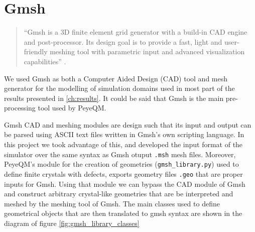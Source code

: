 \section{Gmsh}
\begin{quote}
``Gmsh is a 3D finite element grid generator with a build-in CAD engine and post-processor. Its design goal is to provide a fast, light and user-friendly meshing tool with parametric input and advanced visualization capabilities'' \cite{Geuzaine2009}. 
\end{quote}
We used Gmsh as both a Computer Aided Design (CAD) tool and mesh generator for the modelling of simulation domains used in most part of the results presented in \ref{ch:results}. It could be said that Gmsh is the main pre-processing tool used by PeyeQM.

Gmsh CAD and meshing modules are design such that its input and output can be parsed using ASCII text files written in Gmsh's own scripting language. In this project we took advantage of this, and developed the input format of the simulator over the same syntax as Gmsh otuput \verb|.msh| mesh files. Moreover, PeyeQM's module for the creation of geometries (\verb|gmsh_library.py|) used to define finite crystals with defects, exports geometry files \verb|.geo| that   are proper inputs for Gmsh. Using that module we can bypass the CAD module of Gmsh and construct arbitrary crystal-like geometries that are be interpreted and meshed by the meshing tool of Gmsh. The main classes used to define geometrical objects that are then translated to gmsh syntax are shown in the diagram of figure \ref{fig:gmsh_library_classes}


